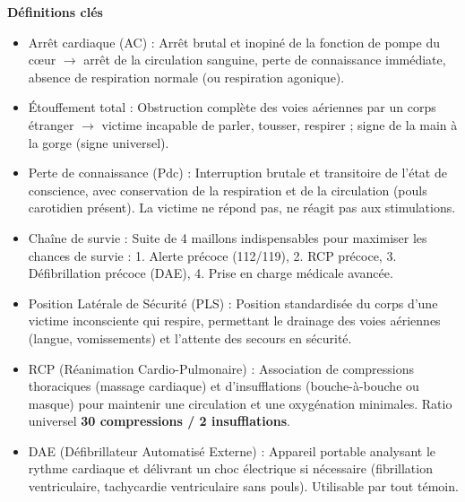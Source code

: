\documentclass[11pt]{article}
\newcommand{\cle}[1]{{\popxbold\color{popdark}#1}}
\begin{document}
\begin{bilan}

\textbf{Définitions clés}
\begin{itemize}
  \item \cle{Arrêt cardiaque (AC)} : Arrêt brutal et inopiné de la fonction de pompe du cœur $\rightarrow$ arrêt de la circulation sanguine, perte de connaissance immédiate, absence de respiration normale (ou respiration agonique).
  \item \cle{Étouffement total} : Obstruction complète des voies aériennes par un corps étranger $\rightarrow$ victime incapable de parler, tousser, respirer ; signe de la main à la gorge (signe universel).
  \item \cle{Perte de connaissance (Pdc)} : Interruption brutale et transitoire de l'état de conscience, avec conservation de la respiration et de la circulation (pouls carotidien présent). La victime ne répond pas, ne réagit pas aux stimulations.
  \item \cle{Chaîne de survie} : Suite de 4 maillons indispensables pour maximiser les chances de survie : 1. Alerte précoce (112/119), 2. RCP précoce, 3. Défibrillation précoce (DAE), 4. Prise en charge médicale avancée.
  \item \cle{Position Latérale de Sécurité (PLS)} : Position standardisée du corps d'une victime inconsciente qui respire, permettant le drainage des voies aériennes (langue, vomissements) et l'attente des secours en sécurité.
  \item \cle{RCP (Réanimation Cardio-Pulmonaire)} : Association de compressions thoraciques (massage cardiaque) et d'insufflations (bouche-à-bouche ou masque) pour maintenir une circulation et une oxygénation minimales. Ratio universel \textbf{30 compressions / 2 insufflations}.
  \item \cle{DAE (Défibrillateur Automatisé Externe)} : Appareil portable analysant le rythme cardiaque et délivrant un choc électrique si nécessaire (fibrillation ventriculaire, tachycardie ventriculaire sans pouls). Utilisable par tout témoin.
\end{itemize}


\end{bilan}
\end{document}
